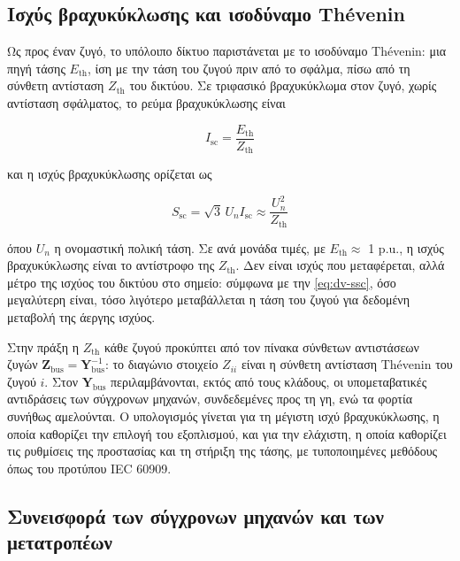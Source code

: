 \subsection{Ισχύς βραχυκύκλωσης και ισοδύναμο Thévenin}
\label{sec:ssc-def}

Ως προς έναν ζυγό, το υπόλοιπο δίκτυο παριστάνεται με το ισοδύναμο Thévenin: μια πηγή τάσης
$E_{\mathrm{th}}$, ίση με την τάση του ζυγού πριν από το σφάλμα, πίσω από τη σύνθετη αντίσταση
$Z_{\mathrm{th}}$ του δικτύου. Σε τριφασικό βραχυκύκλωμα στον ζυγό, χωρίς αντίσταση σφάλματος,
το ρεύμα βραχυκύκλωσης είναι

\begin{equation}
I_{\mathrm{sc}} = \frac{E_{\mathrm{th}}}{Z_{\mathrm{th}}}
\label{eq:isc}
\end{equation}

και η ισχύς βραχυκύκλωσης ορίζεται ως

\begin{equation}
S_{\mathrm{sc}} = \sqrt{3}\, U_n I_{\mathrm{sc}} \approx \frac{U_n^2}{Z_{\mathrm{th}}}
\label{eq:ssc}
\end{equation}

όπου $U_n$ η ονομαστική πολική τάση. Σε ανά μονάδα τιμές, με $E_{\mathrm{th}} \approx$ 1 p.u.,
η ισχύς βραχυκύκλωσης είναι το αντίστροφο της $Z_{\mathrm{th}}$. Δεν είναι ισχύς που
μεταφέρεται, αλλά μέτρο της ισχύος του δικτύου στο σημείο: σύμφωνα με την
\eqref{eq:dv-ssc}, όσο μεγαλύτερη είναι, τόσο λιγότερο μεταβάλλεται η τάση του ζυγού για
δεδομένη μεταβολή της άεργης ισχύος.

Στην πράξη η $Z_{\mathrm{th}}$ κάθε ζυγού προκύπτει από τον πίνακα σύνθετων αντιστάσεων ζυγών
$\mathbf{Z}_{\mathrm{bus}} = \mathbf{Y}_{\mathrm{bus}}^{-1}$: το διαγώνιο στοιχείο $Z_{ii}$
είναι η σύνθετη αντίσταση Thévenin του ζυγού $i$. Στον $\mathbf{Y}_{\mathrm{bus}}$
περιλαμβάνονται, εκτός από τους κλάδους, οι υπομεταβατικές αντιδράσεις των σύγχρονων μηχανών,
συνδεδεμένες προς τη γη, ενώ τα φορτία συνήθως αμελούνται. Ο υπολογισμός γίνεται για τη μέγιστη
ισχύ βραχυκύκλωσης, η οποία καθορίζει την επιλογή του εξοπλισμού, και για την ελάχιστη, η οποία
καθορίζει τις ρυθμίσεις της προστασίας και τη στήριξη της τάσης, με τυποποιημένες μεθόδους όπως
του προτύπου IEC 60909.

\subsection{Συνεισφορά των σύγχρονων μηχανών και των μετατροπέων}
\label{sec:ssc-sources}

